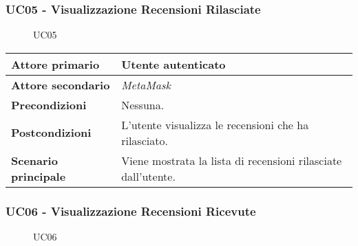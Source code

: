         \subsubsection{UC05 - Visualizzazione Recensioni Rilasciate}
        \label{UC05}

            \begin{figure}[H]
                \centering
                
                \caption{UC05}
            \end{figure}

            \begin{center}
                \renewcommand{\arraystretch}{1.5}
                \begin{tabular}{m{10em} m{20em}}
                    \hline
                    \textbf{Attore primario} & Utente autenticato \\
                    \hline
                    \textbf{Attore secondario} & \textit{MetaMask} \\
                    \hline
                    \textbf{Precondizioni} & Nessuna. \\
                    \hline
                    \textbf{Postcondizioni} & L'utente visualizza le recensioni che ha rilasciato. \\
                    \hline
                    \textbf{Scenario principale} & Viene mostrata la lista di recensioni rilasciate dall'utente. \\
                    \hline
                \end{tabular}
            \end{center}

        \subsubsection{UC06 - Visualizzazione Recensioni Ricevute}
        \label{UC06}

            \begin{figure}[H]
                \centering
                
                \caption{UC06}
            \end{figure}

